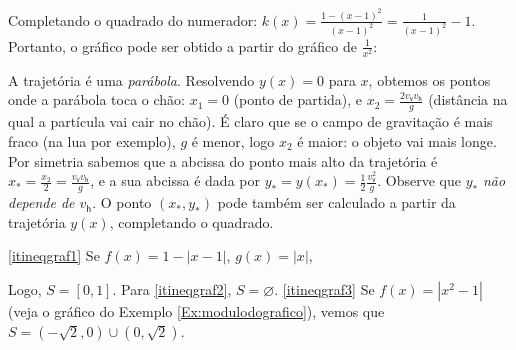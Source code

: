 \begin{Solution}{2.10}
\begin{center}
\end{center}
Completando o quadrado do numerador:
$k(x)=\frac{1-(x-1)^2}{(x-1)^2}=\frac{1}{(x-1)^2}-1$. Portanto, o gráfico pode ser obtido
a partir do gráfico de $\frac{1}{x^2}$:
\begin{center}
\begin{bmlimage}\end{bmlimage}
\end{center}
\end{Solution}
\begin{Solution}{2.11}
A trajetória é uma \emph{parábola}.
Resolvendo $y(x)=0$ para $x$, obtemos os pontos onde a parábola toca o chão: $x_1=0$
(ponto de partida), e
$x_2=\frac{2v_{\textsf{v}}v_{\textsf{h}}}{g}$ (distância na qual a partícula vai cair no
chão).
É claro que se o campo de gravitação é mais fraco (na lua por exemplo), $g$ é menor, logo
$x_2$ é maior: o objeto vai mais longe.
Por simetria sabemos que a abcissa do ponto mais alto da trajetória é
$x_*=\frac{x_2}{2}=\frac{v_{\textsf{v}}v_{\textsf{h}}}{g}$, e a sua abcissa é dada por
$y_*=y(x_*)=\tfrac12 \frac{v_{\textsf{v}}^2}{g}$. Observe que $y_*$ \emph{não depende de
$v_{\textsf{h}}$}.
O ponto $(x_*,y_*)$ pode também ser calculado a partir da trajetória $y(x)$, completando
o quadrado.
\end{Solution}
\begin{Solution}{2.12}
 \eqref{itineqgraf1} Se $f(x)=1-|x-1|$, $g(x)=|x|$,
\begin{center}
\begin{bmlimage}\end{bmlimage}
\end{center}
Logo, $S=[0,1]$. Para \eqref{itineqgraf2}, $S=\varnothing$.
\eqref{itineqgraf3} Se $f(x)=|x^2-1|$ (veja o gráfico do Exemplo
\ref{Ex:modulodografico}), vemos que $S=(-\sqrt{2},0)\cup(0,\sqrt{2})$.
\end{Solution}
